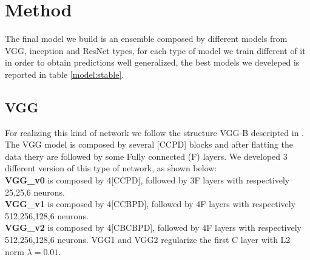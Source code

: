 \documentclass[10pt,twocolumn,letterpaper]{article}
\begin{document}
\section{Method}
The final model we build is an ensemble composed by different models from VGG, inception and ResNet types, for each type of model we train different of it in order to obtain predictions well generalized, the best models we develeped is reported in table \ref{model:stable}.
\subsection{VGG}
\label{subsection:VGG}
For realizing this kind of network we follow the structure VGG-B descripted in \cite{24}. The VGG model is composed by several [CCPD] blocks and after flatting the data thery are followed by some Fully connected (F) layers. We developed 3 different version of this type of network, as shown below:
\\{\bf VGG\_v0} is composed by 4[CCPD], followed by 3F layers with respectively 25,25,6 neurons.
\\{\bf VGG\_v1} is composed by 4[CCBPD], followed by 4F layers with respectively 512,256,128,6 neurons.
\\{\bf VGG\_v2} is composed by 4[CBCBPD], followed by 4F layers with respectively 512,256,128,6 neurons.
VGG1 and VGG2 regularize the first C layer with L2 norm $\lambda=0.01$.
\end{document}
